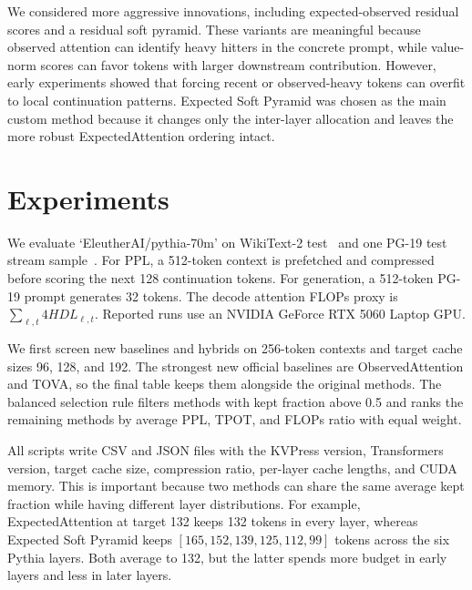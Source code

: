 \documentclass{article}
\begin{document}
We considered more aggressive innovations, including expected-observed residual scores and a residual soft pyramid. These variants are meaningful because observed attention can identify heavy hitters in the concrete prompt, while value-norm scores can favor tokens with larger downstream contribution. However, early experiments showed that forcing recent or observed-heavy tokens can overfit to local continuation patterns. Expected Soft Pyramid was chosen as the main custom method because it changes only the inter-layer allocation and leaves the more robust ExpectedAttention ordering intact.

\section{Experiments}

We evaluate `EleutherAI/pythia-70m' on WikiText-2 test~\citep{merity2017wikitext} and one PG-19 test stream sample~\citep{rae2019compressive}. For PPL, a 512-token context is prefetched and compressed before scoring the next 128 continuation tokens. For generation, a 512-token PG-19 prompt generates 32 tokens. The decode attention FLOPs proxy is $\sum_{\ell,t}4HDL_{\ell,t}$. Reported runs use an NVIDIA GeForce RTX 5060 Laptop GPU.

We first screen new baselines and hybrids on 256-token contexts and target cache sizes 96, 128, and 192. The strongest new official baselines are ObservedAttention and TOVA, so the final table keeps them alongside the original methods. The balanced selection rule filters methods with kept fraction above 0.5 and ranks the remaining methods by average PPL, TPOT, and FLOPs ratio with equal weight.

All scripts write CSV and JSON files with the KVPress version, Transformers version, target cache size, compression ratio, per-layer cache lengths, and CUDA memory. This is important because two methods can share the same average kept fraction while having different layer distributions. For example, ExpectedAttention at target 132 keeps 132 tokens in every layer, whereas Expected Soft Pyramid keeps $[165,152,139,125,112,99]$ tokens across the six Pythia layers. Both average to 132, but the latter spends more budget in early layers and less in later layers.
\end{document}
